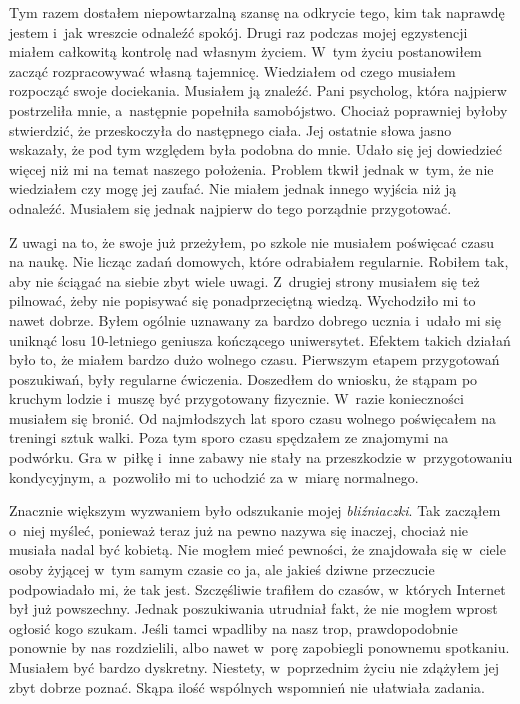 Tym razem dostałem niepowtarzalną szansę na odkrycie tego, kim tak naprawdę jestem i~jak wreszcie odnaleźć spokój. Drugi raz podczas mojej egzystencji miałem całkowitą kontrolę nad własnym życiem. W~tym życiu postanowiłem zacząć rozpracowywać własną tajemnicę. Wiedziałem od czego musiałem rozpocząć swoje dociekania. Musiałem ją znaleźć. Pani psycholog, która najpierw postrzeliła mnie, a~następnie popełniła samobójstwo. Chociaż poprawniej byłoby stwierdzić, że przeskoczyła do następnego ciała. Jej ostatnie słowa jasno wskazały, że pod tym względem była podobna do mnie. Udało się jej dowiedzieć więcej niż mi na temat naszego położenia. Problem tkwił jednak w~tym, że nie wiedziałem czy mogę jej zaufać. Nie miałem jednak innego wyjścia niż ją odnaleźć. Musiałem się jednak najpierw do tego porządnie przygotować. 

Z uwagi na to, że swoje już przeżyłem, po szkole nie musiałem poświęcać czasu na naukę. Nie licząc zadań domowych, które odrabiałem regularnie. Robiłem tak, aby nie ściągać na siebie zbyt wiele uwagi. Z~drugiej strony musiałem się też pilnować, żeby nie popisywać się ponadprzeciętną wiedzą. Wychodziło mi to nawet dobrze. Byłem ogólnie uznawany za bardzo dobrego ucznia i~udało mi się uniknąć losu 10-letniego geniusza kończącego uniwersytet. Efektem takich działań było to, że miałem bardzo dużo wolnego czasu. Pierwszym etapem przygotowań poszukiwań, były regularne ćwiczenia. Doszedłem do wniosku, że stąpam po kruchym lodzie i~muszę być przygotowany fizycznie. W~razie konieczności musiałem się bronić. Od najmłodszych lat sporo czasu wolnego poświęcałem na treningi sztuk walki. Poza tym sporo czasu spędzałem ze znajomymi na podwórku. Gra w~piłkę i~inne zabawy nie stały na przeszkodzie w~przygotowaniu kondycyjnym, a~pozwoliło mi to uchodzić za w~miarę normalnego. 

Znacznie większym wyzwaniem było odszukanie mojej \emph{bliźniaczki}. Tak zacząłem o~niej myśleć, ponieważ teraz już na pewno nazywa się inaczej, chociaż nie musiała nadal być kobietą. Nie mogłem mieć pewności, że znajdowała się w~ciele osoby żyjącej w~tym samym czasie co ja, ale jakieś dziwne przeczucie podpowiadało mi, że tak jest. Szczęśliwie trafiłem do czasów, w~których Internet był już powszechny. Jednak poszukiwania utrudniał fakt, że nie mogłem wprost ogłosić kogo szukam. Jeśli tamci wpadliby na nasz trop, prawdopodobnie ponownie by nas rozdzielili, albo nawet w~porę zapobiegli ponownemu spotkaniu. Musiałem być bardzo dyskretny. Niestety, w~poprzednim życiu nie zdążyłem jej zbyt dobrze poznać. Skąpa ilość wspólnych wspomnień nie ułatwiała zadania. 

